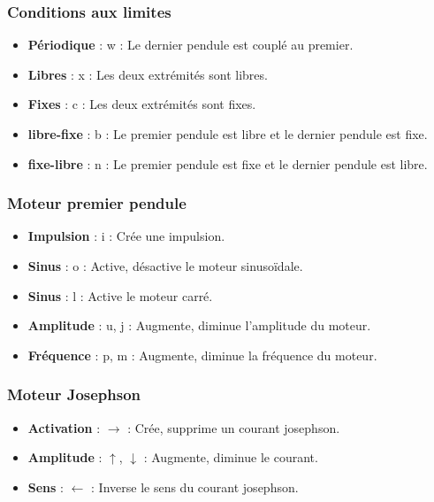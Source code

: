 \subsubsection{Conditions aux limites}
%
\begin{itemize}[label=, leftmargin=2cm, itemsep=0pt]
\item {\bf Périodique} : {\sf w} : Le dernier pendule est couplé au premier.
\item {\bf Libres} : {\sf x} : Les deux extrémités sont libres.
\item {\bf Fixes} : {\sf c} : Les deux extrémités sont fixes.
\item {\bf libre-fixe} : {\sf b} : Le premier pendule est libre et le dernier pendule est fixe.
\item {\bf fixe-libre} : {\sf n} : Le premier pendule est fixe et le dernier pendule est libre.
\end{itemize}
%
%
\subsubsection{Moteur premier pendule}
%
\begin{itemize}[label=, leftmargin=2cm, itemsep=0pt]
\item {\bf Impulsion} : {\sf i} : Crée une impulsion.
\item {\bf Sinus} : {\sf o} : Active, désactive le moteur sinusoïdale.
\item {\bf Sinus} : {\sf l} : Active le moteur carré.
\item {\bf Amplitude} : {\sf u, j} :  Augmente, diminue l'amplitude du moteur.
\item {\bf Fréquence} : {\sf p, m} :  Augmente, diminue la fréquence du moteur.
\end{itemize}
%
%
\subsubsection{Moteur Josephson}
%
\begin{itemize}[label=, leftmargin=2cm, itemsep=0pt]
\item {\bf Activation} : $\rightarrow$ : Crée, supprime un courant josephson.
\item {\bf Amplitude} : $\mathtt{\uparrow}$, $\mathsf{\downarrow}$ : Augmente, diminue le courant.
\item {\bf Sens} : {\sf $\leftarrow$} : Inverse le sens du courant josephson.
\end{itemize}
%
%
